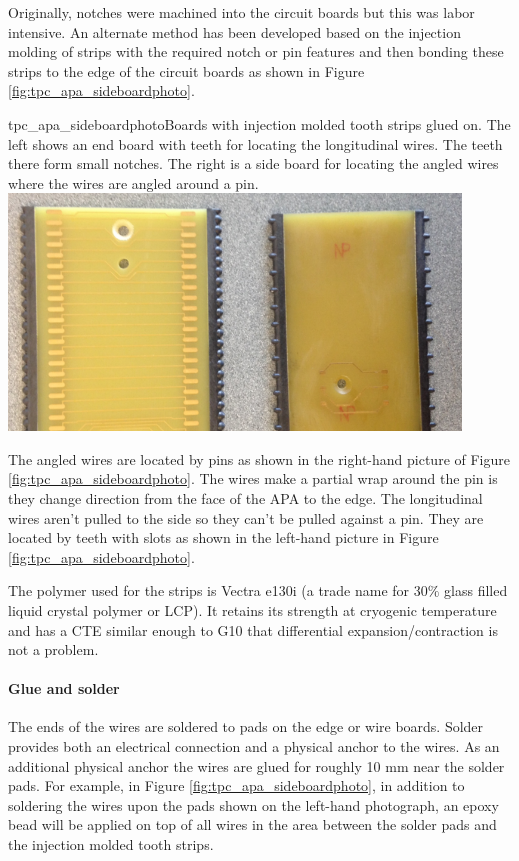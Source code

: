 Originally, notches were machined into the circuit boards but this was labor intensive.  An alternate method has been developed based on the injection molding of strips with the required notch or pin features and then bonding these strips to the edge of the circuit boards as shown in Figure \ref{fig:tpc_apa_sideboardphoto}.

\begin{cdrfigure}{tpc_apa_sideboardphoto}{Boards with injection molded tooth strips glued on.  The left shows an end board with teeth for locating the longitudinal wires.  The teeth there form small notches. The right is a side board for locating the angled wires where the wires are angled around a pin.}
\includegraphics[width=0.9\textwidth]{figures/tpc_apa_sideboardphoto.png} 
\end{cdrfigure}

The angled wires are located by pins as shown in the right-hand picture of Figure \ref{fig:tpc_apa_sideboardphoto}.  The wires make a partial wrap around the pin is they change direction from the face of the APA to the edge.  The longitudinal wires aren't pulled to the side so they can't be pulled against a pin.  They are located by teeth with slots as shown in the left-hand picture in Figure \ref{fig:tpc_apa_sideboardphoto}. 
	
The polymer used for the strips is Vectra e130i (a trade name for 30$\%$ glass filled liquid crystal polymer or LCP). It retains its strength at cryogenic temperature and has a CTE similar enough to G10 that differential expansion/contraction is not a problem.

\paragraph{Glue and solder}
The ends of the wires are soldered to pads on the edge or wire boards.  Solder provides both an electrical connection and a physical anchor to the wires.  As an additional physical anchor the wires are glued for roughly 10 mm near the solder pads.  For example, in Figure \ref{fig:tpc_apa_sideboardphoto}, in addition to soldering the wires upon the pads shown on the left-hand photograph, an epoxy bead will be applied on top of all wires in the area between the solder pads and the injection molded tooth strips.

